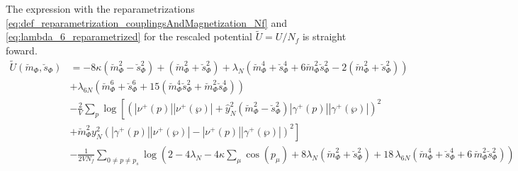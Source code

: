 The expression with the reparametrizations \eqref{eq:def_reparametrization_couplingsAndMagnetization_Nf} and \eqref{eq:lambda_6_reparametrized} for the rescaled potential
$\tilde{U}=U/N_f$ is straight foward. 
\begin{align}\label{eq:improved_zeroOrderPot_withPhi6_rescaled}
 \tilde U(\breve m_{\Phi}, \breve s_{\Phi}) &= -8 \kappa \left( \breve m_{\Phi}^2 - \breve s_{\Phi}^2 \right)   +   \left( \breve m_{\Phi}^2 + \breve s_{\Phi}^2 \right)
                         + \lambda_N \left( \breve m_{\Phi}^4 + \breve s_{\Phi}^4 + 6 \breve m_{\Phi}^2 \breve s_{\Phi}^2 
                         - 2  \left(\breve m_{\Phi}^2 + \breve s_{\Phi}^2 \right) \right) 
         \nonumber \\
                        & + \lambda_{6N} \left( \breve m_{\Phi}^6 + \breve s_{\Phi}^6 + 15 \left( \breve m_{\Phi}^4 \breve s_{\Phi}^2 
                          + \breve m_{\Phi}^2 \breve s_{\Phi}^4 \right)   \right)
         \nonumber \\
                        & -\frac{2}{V} \sum\limits_p \log
                                    \left[ \left( |\nu^+(p)| |\nu^+(\wp)|   +
                                    \hat y^2_N \left( \breve m_{\Phi}^2 - \breve s_{\Phi}^2 \right) |\gamma^+(p)| |\gamma^+(\wp)|\right)^2 
         \nonumber \right. \\
                        & \left. +  \breve m_{\Phi}^2 y^2_N \left( |\gamma^+(p)| |\nu^+(\wp)|   -   |\nu^+(p)| |\gamma^+(\wp)| \right)^2\right]
         \nonumber \\
                        & - \frac{1}{2VN_f}\sum\limits_{0 \neq p \neq p_s} 
          \log\left( 2 - 4 \lambda_N - 4 \kappa \sum_{\mu} \cos(p_{\mu}) + 8 \lambda_N \left( \breve m_{\Phi}^2 + \breve s_{\Phi}^2  \right) 
                     +  18\,\lambda_{6N} \left( \breve m_{\Phi}^4 + \breve s_{\Phi}^4 +6\, \breve  m_{\Phi}^2 \breve s_{\Phi}^2 \right) \right)
\end{align}






